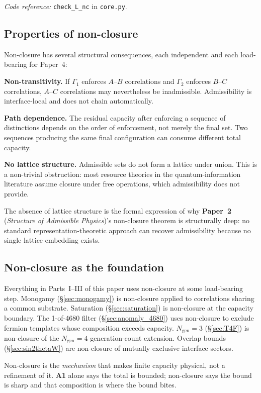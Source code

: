 \documentclass[11pt]{article}
\newcommand{\coderef}[2]{\smallskip\noindent\textit{Code reference:} \texttt{#1} in \texttt{#2}.}
\newcommand{\Aone}{\textbf{A1}}
\newcommand{\paperref}[2]{\textbf{Paper~#1} (\textit{#2})}
\theoremstyle{definition}
\begin{document}
\coderef{check\_L\_nc}{core.py}

\subsection{Properties of non-closure}\label{sec:non_closure_properties}

Non-closure has several structural consequences, each independent and each load-bearing for Paper~4:

\textbf{Non-transitivity.} If $\Gamma_1$ enforces $A$--$B$ correlations and $\Gamma_2$ enforces $B$--$C$ correlations, $A$--$C$ correlations may nevertheless be inadmissible. Admissibility is interface-local and does not chain automatically.

\textbf{Path dependence.} The residual capacity after enforcing a sequence of distinctions depends on the order of enforcement, not merely the final set. Two sequences producing the same final configuration can consume different total capacity.

\textbf{No lattice structure.} Admissible sets do not form a lattice under union. This is a non-trivial obstruction: most resource theories in the quantum-information literature assume closure under free operations, which admissibility does not provide.

The absence of lattice structure is the formal expression of why \paperref{2}{Structure of Admissible Physics}'s non-closure theorem is structurally deep: no standard representation-theoretic approach can recover admissibility because no single lattice embedding exists.

\subsection{Non-closure as the foundation}\label{sec:non_closure_foundation}

Everything in Parts~I--III of this paper uses non-closure at some load-bearing step. Monogamy (\S\ref{sec:monogamy}) is non-closure applied to correlations sharing a common substrate. Saturation (\S\ref{sec:saturation}) is non-closure at the capacity boundary. The 1-of-4680 filter (\S\ref{sec:anomaly_4680}) uses non-closure to exclude fermion templates whose composition exceeds capacity. $N_{\mathrm{gen}} = 3$ (\S\ref{sec:T4F}) is non-closure of the $N_{\mathrm{gen}} = 4$ generation-count extension. Overlap bounds (\S\ref{sec:sin2thetaW}) are non-closure of mutually exclusive interface sectors.

Non-closure is the \emph{mechanism} that makes finite capacity physical, not a refinement of it. \Aone{} alone says the total is bounded; non-closure says the bound is sharp and that composition is where the bound bites.
\end{document}
